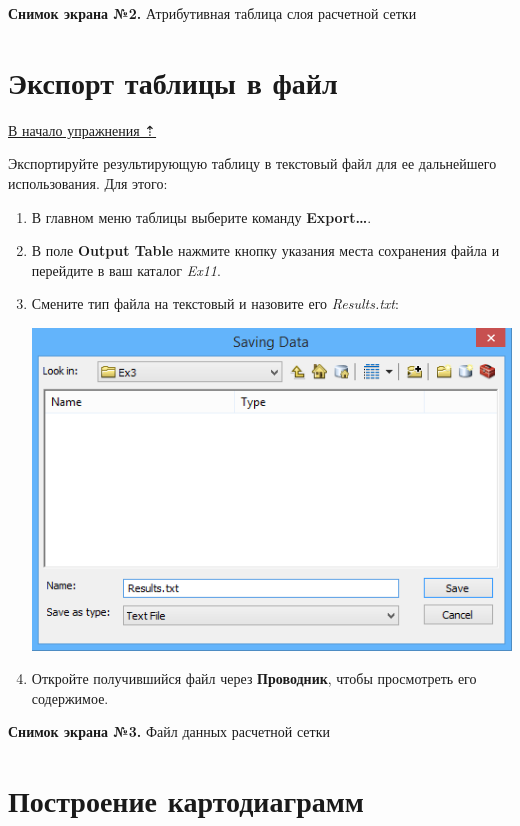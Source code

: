 \documentclass[12pt,]{book}
\begin{document}
\textbf{Снимок экрана №2.} Атрибутивная таблица слоя расчетной сетки

\hypertarget{land-cover-hydro-export}{%
\section{Экспорт таблицы в файл}\label{land-cover-hydro-export}}

\protect\hyperlink{land-cover-hydro}{В начало упражнения ⇡}

Экспортируйте результирующую таблицу в текстовый файл для ее дальнейшего использования. Для этого:

\begin{enumerate}
\def\labelenumi{\arabic{enumi}.}
\item
  В главном меню таблицы выберите команду \textbf{Export\ldots{}}.
\item
  В поле \textbf{Output Table} нажмите кнопку указания места сохранения файла и перейдите в ваш каталог \emph{Ex11}.
\item
  Смените тип файла на текстовый и назовите его \emph{Results.txt}:

  \includegraphics{images/Ex11/image14.png}
\item
  Откройте получившийся файл через \textbf{Проводник}, чтобы просмотреть его содержимое.
\end{enumerate}

\textbf{Снимок экрана №3.} Файл данных расчетной сетки

\hypertarget{land-cover-hydro-diagrams}{%
\section{Построение картодиаграмм}\label{land-cover-hydro-diagrams}}
\end{document}
